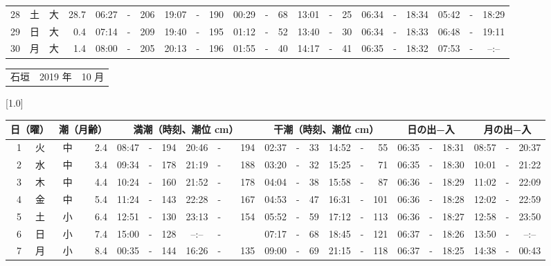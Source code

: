 \documentclass[12pt,a4j]{jsarticle}
\begin{document}
\begin{table}[htbp]
\begin{center}
{\begin{tabular}{|rc|cr|ccrccr|ccrccr|ccc|ccc|}
28 & 土 & 大 & 28.7 &  06:27 &-& 206 &  19:07 &-& 190 &  00:29 &-&  68 &  13:01 &-&  25 & 06:34 & -& 18:34 & 05:42 & -& 18:29 \\
29 & 日 & 大 &  0.4 &  07:14 &-& 209 &  19:40 &-& 195 &  01:12 &-&  52 &  13:40 &-&  30 & 06:34 & -& 18:33 & 06:48 & -& 19:11 \\
30 & 月 & 大 &  1.4 &  08:00 &-& 205 &  20:13 &-& 196 &  01:55 &-&  40 &  14:17 &-&  41 & 06:35 & -& 18:32 & 07:53 & -& --:-- \\
   \hline
   \end{tabular}}
   \end{center}
\end{table}
\newpage
 \begin{table}[htbp]
 \begin{center}
 \begin{tabular}{lcc}
 \LARGE{石垣}  & \large{2019 年} & \large{10 月} \\
 \end{tabular}
 \end{center}
 \begin{center}
    \scalebox{0.7}[1.0]{
    \begin{tabular}{|rc|cr|ccrccr|ccrccr|ccc|ccc|}
    \hline
    \multicolumn{2}{|c|}{日（曜）} & \multicolumn{2}{c|}{潮（月齢）} & \multicolumn{6}{c|}{満潮（時刻、潮位 cm）} & \multicolumn{6}{c|}{干潮（時刻、潮位 cm）} & \multicolumn{3}{c|}{日の出−入} &  \multicolumn{3}{c|}{月の出−入}\\
 \hline
 1 & 火 & 中 &  2.4 &  08:47 &-& 194 &  20:46 &-& 194 &  02:37 &-&  33 &  14:52 &-&  55 & 06:35 & -& 18:31 & 08:57 & -& 20:37 \\
 2 & 水 & 中 &  3.4 &  09:34 &-& 178 &  21:19 &-& 188 &  03:20 &-&  32 &  15:25 &-&  71 & 06:35 & -& 18:30 & 10:01 & -& 21:22 \\
 3 & 木 & 中 &  4.4 &  10:24 &-& 160 &  21:52 &-& 178 &  04:04 &-&  38 &  15:58 &-&  87 & 06:36 & -& 18:29 & 11:02 & -& 22:09 \\
 4 & 金 & 中 &  5.4 &  11:24 &-& 143 &  22:28 &-& 167 &  04:53 &-&  47 &  16:31 &-& 101 & 06:36 & -& 18:28 & 12:02 & -& 22:59 \\
 5 & 土 & 小 &  6.4 &  12:51 &-& 130 &  23:13 &-& 154 &  05:52 &-&  59 &  17:12 &-& 113 & 06:36 & -& 18:27 & 12:58 & -& 23:50 \\
 6 & 日 & 小 &  7.4 &  15:00 &-& 128 &  --:-- &-&~~~~~ &  07:17 &-&  68 &  18:45 &-& 121 & 06:37 & -& 18:26 & 13:50 & -& --:-- \\
 7 & 月 & 小 &  8.4 &  00:35 &-& 144 &  16:26 &-& 135 &  09:00 &-&  69 &  21:15 &-& 118 & 06:37 & -& 18:25 & 14:38 & -& 00:43 \\

\end{tabular}}
\end{center}
\end{table}
\end{document}
